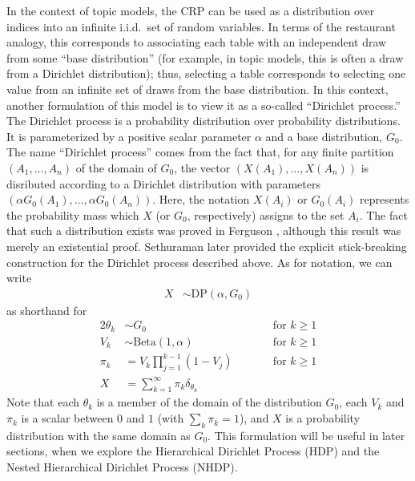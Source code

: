 \documentclass{article}
\begin{document}
In the context of topic models, the CRP can be used as a distribution over indices into an infinite i.i.d.\ set of random variables.
In terms of the restaurant analogy, this corresponds to associating each table with an independent draw from some ``base distribution'' (for example, in topic models, this is often a draw from a Dirichlet distribution); thus, selecting a table corresponds to selecting one value from an infinite set of draws from the base distribution.
In this context, another formulation of this model is to view it as a so-called ``Dirichlet process.''
The Dirichlet process is a probability distribution over probability distributions.
It is parameterized by a positive scalar parameter $\alpha$ and a base distribution, $G_0$.
The name ``Dirichlet process'' comes from the fact that, for any finite partition $(A_1, \ldots, A_n)$ of the domain of $G_0$, the vector $(X(A_1), \ldots, X(A_n))$ is disributed according to a Dirichlet distribution with parameters $(\alpha G_0(A_1), \ldots, \alpha G_0(A_n))$.
Here, the notation $X(A_i)$ or $G_0(A_i)$ represents the probability mass which $X$ (or $G_0$, respectively) assigns to the set $A_i$.
The fact that such a distribution exists was proved in Ferguson \cite{ferguson1973bayesian}, although this result was merely an existential proof.
Sethuraman \cite{sethuraman1994constructive} later provided the explicit stick-breaking construction for the Dirichlet process described above.
As for notation, we can write
\begin{align}
X &\sim \text{DP}(\alpha, G_0)
\end{align}
as shorthand for
\begin{alignat}{2}
\theta_k &\sim G_0 &\qquad& \text{for $k \geq 1$} \\
V_k &\sim \text{Beta}(1, \alpha) &\qquad& \text{for $k \geq 1$} \\
\pi_k &= V_k \prod_{j=1}^{k-1} (1 - V_j) &\qquad& \text{for $k \geq 1$} \\
X &= \sum_{k=1}^\infty \pi_k \delta_{\theta_k} &&
\end{alignat}
Note that each $\theta_k$ is a member of the domain of the distribution $G_0$, each $V_k$ and $\pi_k$ is a scalar between $0$ and $1$ (with $\sum_k \pi_k = 1$), and $X$ is a probability distribution with the same domain as $G_0$.
This formulation will be useful in later sections, when we explore the Hierarchical Dirichlet Process (HDP) and the Nested Hierarchical Dirichlet Process (NHDP).
\end{document}
